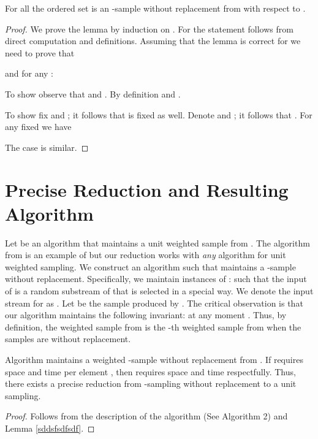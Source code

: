 \documentclass{llncs}
\begin{document}
\begin{lemma}\label{sddsfsdfsdf}
For all  the ordered set  is an  -sample without replacement from  with respect to .
\end{lemma}
\begin{proof}
We prove the lemma by induction on . For  the statement follows from direct computation and definitions.
Assuming that the lemma is correct for  we need to prove that

and for any :

To show  observe that  and .
By definition   and .

To show  fix  and ; it follows that  is fixed as well.
Denote  and ; it follows that .
For any fixed  we have

The case  is similar.
\end{proof}

\section{Precise Reduction and Resulting Algorithm}\label{sddssdsdfsdf}

Let  be an algorithm that maintains a unit weighted sample from . The algorithm from \cite{joins} is an example of  but our reduction works with \emph{any} algorithm for unit weighted sampling.
We construct an algorithm  such that  maintains a -sample without replacement.
Specifically, we maintain  instances of :  such that the input of  is a random substream of  that is selected in a special way. We denote the input stream for  as .
Let  be the sample produced by .
The critical observation is that our algorithm maintains the following invariant: at any moment . Thus, by definition, the weighted sample from  is the -th weighted sample from  when the samples are without replacement.

\begin{theorem}\label{lm:strem weighted}
Algorithm  maintains a weighted -sample without replacement from .
If  requires space  and time per element , then  requires  space and  time respectfully.
Thus, there exists a precise reduction from -sampling without replacement to a unit sampling.
\end{theorem}
\begin{proof}

Follows from the description of the algorithm (See Algorithm 2) and Lemma \ref{sddsfsdfsdf}.
\end{proof}
\end{document}

